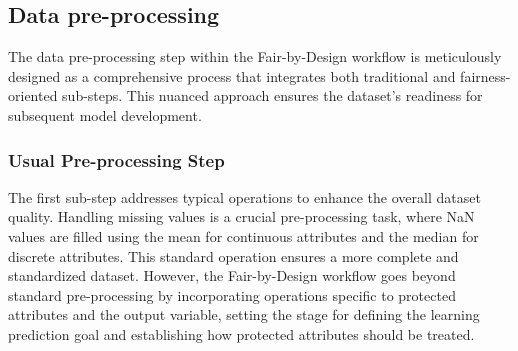 \subsection{Data pre-processing}

The data pre-processing step within the Fair-by-Design workflow is meticulously designed as a comprehensive process that integrates both traditional and fairness-oriented sub-steps. This nuanced approach ensures the dataset's readiness for subsequent model development.

\subsubsection{Usual Pre-processing Step}

The first sub-step addresses typical operations to enhance the overall dataset quality. Handling missing values is a crucial pre-processing task, where NaN values are filled using the mean for continuous attributes and the median for discrete attributes. This standard operation ensures a more complete and standardized dataset. However, the Fair-by-Design workflow goes beyond standard pre-processing by incorporating operations specific to protected attributes and the output variable, setting the stage for defining the learning prediction goal and establishing how protected attributes should be treated.

